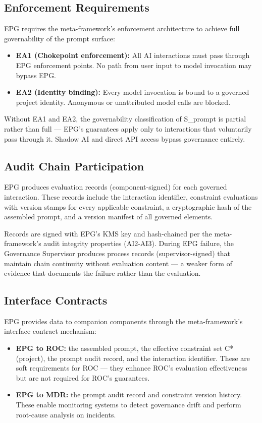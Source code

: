 \subsection{Enforcement Requirements}


EPG requires the meta-framework's enforcement architecture to achieve full governability of the prompt surface:

\begin{itemize}
  \item \textbf{EA1 (Chokepoint enforcement):} All AI interactions must pass through EPG enforcement points. No path from user input to model invocation may bypass EPG.
  \item \textbf{EA2 (Identity binding):} Every model invocation is bound to a governed project identity. Anonymous or unattributed model calls are blocked.
\end{itemize}


Without EA1 and EA2, the governability classification of S\_\allowbreak{}prompt is partial rather than full --- EPG's guarantees apply only to interactions that voluntarily pass through it. Shadow AI and direct API access bypass governance entirely.

\subsection{Audit Chain Participation}


EPG produces evaluation records (component-signed) for each governed interaction. These records include the interaction identifier, constraint evaluations with version stamps for every applicable constraint, a cryptographic hash of the assembled prompt, and a version manifest of all governed elements.

Records are signed with EPG's KMS key and hash-chained per the meta-framework's audit integrity properties (AI2-AI3). During EPG failure, the Governance Supervisor produces process records (supervisor-signed) that maintain chain continuity without evaluation content --- a weaker form of evidence that documents the failure rather than the evaluation.

\subsection{Interface Contracts}


EPG provides data to companion components through the meta-framework's interface contract mechanism:

\begin{itemize}
  \item \textbf{EPG to ROC:} the assembled prompt, the effective constraint set C*(project), the prompt audit record, and the interaction identifier. These are soft requirements for ROC --- they enhance ROC's evaluation effectiveness but are not required for ROC's guarantees.
  \item \textbf{EPG to MDR:} the prompt audit record and constraint version history. These enable monitoring systems to detect governance drift and perform root-cause analysis on incidents.
\end{itemize}



